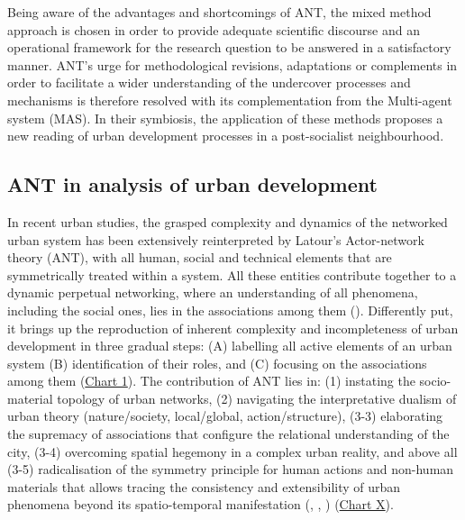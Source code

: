 \documentclass[11pt]{report}
\begin{document}
{{{{Being aware of the advantages and shortcomings of ANT, the mixed method approach is chosen in order to provide adequate scientific discourse and an operational framework for the research question to be answered in a satisfactory manner.
ANT's urge for methodological revisions, adaptations or complements in order to facilitate a wider understanding of the undercover processes and mechanisms is therefore resolved with its complementation from the Multi-agent system (MAS).
In their symbiosis, the application of these methods proposes a new reading of urban development processes in a post-socialist neighbourhood.

\subsection{ANT in analysis of urban development}

In recent urban studies, the grasped complexity and dynamics of the networked urban system has been extensively reinterpreted by Latour’s Actor-network theory (ANT), with all human, social and technical elements that are symmetrically treated within a system. All these entities contribute together to a dynamic perpetual networking, where an understanding of all phenomena, including the social ones, lies in the associations among them  (\href{Latour}{\citealt{latour_reassembling_2005}}). Differently put, it brings up the reproduction of inherent complexity and incompleteness of urban development in three gradual steps:  (A) labelling all active elements of an urban system (B) identification of their roles, and (C) focusing on the associations among them (\href{Chart 1}{Chart 1}). The contribution of ANT lies in: (1) instating the socio-material topology of urban networks, (2) navigating the interpretative dualism of urban theory (nature/society, local/global, action/structure), (3-3) elaborating the supremacy of associations that configure the relational understanding of the city, (3-4) overcoming spatial hegemony in a complex urban reality, and above all (3-5) radicalisation of the symmetry principle for human actions and non-human materials that allows tracing the consistency and extensibility of urban phenomena beyond its spatio-temporal manifestation (\href{Latour}{\citealt{latour_we_1993}}, \href{Murdoch}{\citealt{murdoch_spaces_1998}}, \href{Farias}{\citealt{farias_introduction:_2011}}) (\href{Table 1}{Chart X}).
\\

}}}}
\end{document}
